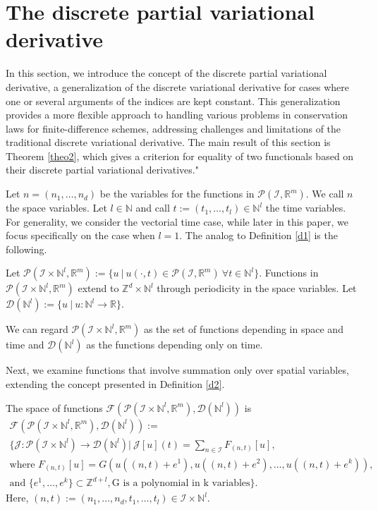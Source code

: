 \documentclass[runningheads]{llncs}
\newcommand{\Rr}{\mathbb{R}}
\newcommand{\Nn}{\mathbb{N}}
\newcommand{\Zz}{{\mathbb{Z}}}
\newcommand{\1}{\chi}
\newcommand{\Ii}{\mathcal{I}}
\begin{document}
\section{The discrete partial variational derivative}
\label{pvard}

In this section, we introduce the concept of the discrete partial variational derivative, a generalization of the discrete variational derivative for cases where one or several arguments of the indices are kept constant. This generalization provides a more flexible approach to handling various problems in conservation laws for finite-difference schemes, addressing challenges and limitations of the traditional discrete variational derivative. The main result of this section is Theorem \ref{theo2}, which gives a criterion for equality of two functionals based on their discrete partial variational derivatives."

Let $n=(n_1,\ldots,n_d)$ be the variables for the functions in $\mathcal{P}(\Ii,\Rr^m)$. We call $n$ the space variables. Let $l\in\Nn$ and call $t:=(t_1,\ldots,t_l)\in\Nn^l$ the time variables. For generality, we consider the vectorial time case, while later in this paper, we focus specifically on the case when $l=1$.
The analog to Definition \ref{d1} is the following. 
\begin{definition}
	Let $\mathcal{P}(\Ii\times\Nn^l,\Rr^m):=\{u\ |\ u(\cdot,t)\in\mathcal{P}(\Ii,\Rr^m)\ \forall t\in\Nn^l \}$.
	Functions in $\mathcal{P}(\Ii\times\Nn^l,\Rr^m)$ extend to $\Zz^d\times\Nn^l$ through  periodicity in the space variables.
	Let $\mathcal{D}(\Nn^l):=\{u\ |\ u:\Nn^l\rightarrow\Rr\}$.
\end{definition}
We can regard $\mathcal{P}(\Ii\times\Nn^l,\Rr^m)$ as the set of functions depending in space and time and $\mathcal{D}(\Nn^l)$ as the functions depending only on time. 

Next, we examine functions that involve summation only over spatial variables, extending the concept presented in Definition \ref{d2}.
\begin{definition}
	\label{quantityfunc2}
	The space of functions $\mathcal{F}(\mathcal{P}(\Ii\times\Nn^l,\Rr^m),\mathcal{D}(\Nn^l))$ is
	\begin{gather*}
		\mathcal{F}(\mathcal{P}(\Ii\times\Nn^l,\Rr^m),\mathcal{D}(\Nn^l)):=\\	
		\Bigg\{\mathcal{J}:\mathcal{P}(\Ii\times\Nn^l)\rightarrow\mathcal{D}(\Nn^l) \Bigg|\ \mathcal{J}[u](t)=\sum_{n\in\Ii}F_{(n,t)}[u],\\
		\text{where } F_{(n,t)}[u]=G(u((n,t)+e^1),u((n,t)+e^2),\ldots,u((n,t)+e^k)),\\
		\text{and }
		\{e^1,\ldots,e^k\}\subset\Zz^{d+l},\text{G is a polynomial in k variables}\Bigg\}.
	\end{gather*}
	Here, $(n,t):=(n_1,\ldots,n_d,t_1,\ldots,t_l)\in\Ii\times\Nn^l$.
\end{definition}
\end{document}
